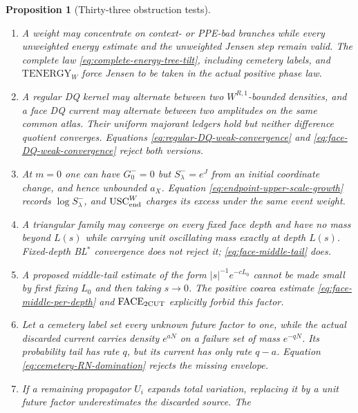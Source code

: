 \documentclass[11pt]{article}
\newtheorem{proposition}[theorem]{Proposition}
\begin{document}
\begin{proposition}[Thirty-three obstruction tests]
\begin{enumerate}[label=\textup{(T\arabic*)}]
      full event weight grow like $e^{aN}$ on precisely those branches, with
      an available $L^{p_W}$ moment.  Its marked tail is degraded and cannot
      retain exponent $q$.  Equations
      \eqref{eq:tilted-auxiliary-tails} and
      \eqref{eq:holder-degraded-energy-rates} use only the degraded rate.
\item A weight may concentrate on context- or PPE-bad branches while every
      unweighted energy estimate and the unweighted Jensen step remain
      valid.  The complete law \eqref{eq:complete-energy-tree-tilt}, including
      cemetery labels, and $\mathrm{TENERGY}_{W}$ force Jensen to be taken in
      the actual positive phase law.
\item A regular DQ kernel may alternate between two
      $W^{R,1}$-bounded densities, and a face DQ current may alternate between
      two amplitudes on the same common atlas.  Their uniform majorant ledgers
      hold but neither difference quotient converges.  Equations
      \eqref{eq:regular-DQ-weak-convergence} and
      \eqref{eq:face-DQ-weak-convergence} reject both versions.
\item At $m=0$ one can have $G_0^-=0$ but
      $S_\lambda^-=e^J$ from an initial coordinate change, and hence
      unbounded $a_X$.  Equation \eqref{eq:endpoint-upper-scale-growth} records
      $\log S_\lambda^-$, and $\mathrm{USC}_{\rm end}^{W}$ charges its excess
      under the same event weight.
\item A triangular family may converge on every fixed face depth and have
      no mass beyond $L(s)$ while carrying unit oscillating mass exactly at
      depth $L(s)$.  Fixed-depth BL$^*$ convergence does not reject it;
      \eqref{eq:face-middle-tail} does.
\item A proposed middle-tail estimate of the form
      $|s|^{-1}e^{-cL_0}$ cannot be made small by first fixing $L_0$ and then
      taking $s\to0$.  The positive coarea estimate
      \eqref{eq:face-middle-per-depth} and
      $\mathrm{FACE}_{\rm 2CUT}$ explicitly forbid this factor.
\item Let a cemetery label set every unknown future factor to one, while the
      actual discarded current carries density $e^{aN}$ on a failure set of
      mass $e^{-qN}$.  Its probability tail has rate $q$, but its current
      has only rate $q-a$.  Equation \eqref{eq:cemetery-RN-domination}
      rejects the missing envelope.
\item If a remaining propagator $U_i$ expands total variation, replacing it
      by a unit future factor underestimates the discarded source.  The

\end{enumerate}
\end{proposition}
\end{document}
